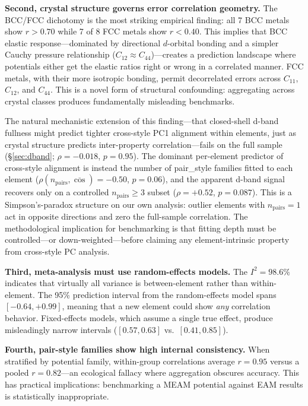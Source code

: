 \documentclass[twocolumn,9pt]{extarticle}
\begin{document}
\textbf{Second, crystal structure governs error correlation geometry.} The BCC/FCC dichotomy is the most striking empirical finding: all 7 BCC metals show $r > 0.70$ while 7 of 8 FCC metals show $r < 0.40$. This implies that BCC elastic response---dominated by directional $d$-orbital bonding and a simpler Cauchy pressure relationship ($C_{12} \approx C_{44}$)---creates a prediction landscape where potentials either get the elastic ratios right or wrong in a correlated manner. FCC metals, with their more isotropic bonding, permit decorrelated errors across $C_{11}$, $C_{12}$, and $C_{44}$. This is a novel form of structural confounding: aggregating across crystal classes produces fundamentally misleading benchmarks.

The natural mechanistic extension of this finding---that closed-shell d-band fullness might predict tighter cross-style PC1 alignment within elements, just as crystal structure predicts inter-property correlation---fails on the full sample (\S\ref{sec:dband}; $\rho = -0.018$, $p = 0.95$). The dominant per-element predictor of cross-style alignment is instead the number of pair\_style families fitted to each element ($\rho(n_{\text{pairs}}, \overline{\cos}) = -0.50$, $p = 0.06$), and the apparent d-band signal recovers only on a controlled $n_{\text{pairs}} \geq 3$ subset ($\rho = +0.52$, $p = 0.087$). This is a Simpson's-paradox structure on our own analysis: outlier elements with $n_{\text{pairs}} = 1$ act in opposite directions and zero the full-sample correlation. The methodological implication for benchmarking is that fitting depth must be controlled---or down-weighted---before claiming any element-intrinsic property from cross-style PC analysis.

\textbf{Third, meta-analysis must use random-effects models.} The $I^2 = 98.6\%$ indicates that virtually all variance is between-element rather than within-element. The 95\% prediction interval from the random-effects model spans $[-0.64, +0.99]$, meaning that a new element could show \textit{any} correlation behavior. Fixed-effects models, which assume a single true effect, produce misleadingly narrow intervals ($[0.57, 0.63]$ vs.\ $[0.41, 0.85]$).

\textbf{Fourth, pair-style families show high internal consistency.} When stratified by potential family, within-group correlations average $r = 0.95$ versus a pooled $r = 0.82$---an ecological fallacy where aggregation obscures accuracy. This has practical implications: benchmarking a MEAM potential against EAM results is statistically inappropriate.
\end{document}
